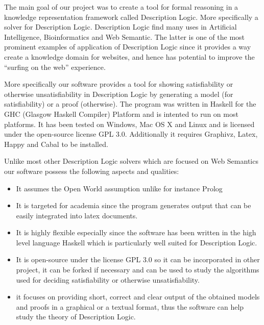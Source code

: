 
The main goal of our project was to create a tool for formal reasoning
in a knowledge representation framework called Description Logic. More
specifically a solver for Description Logic. Description Logic find
many uses in Artificial Intelligence, Bioinformatics and Web
Semantic. The latter is one of the most prominent examples of
application of Description Logic since it provides a way create a
knowledge domain for websites, and hence has potential to improve the
``surfing on the web'' experience.

More specifically our software provides a tool for showing
satisfiability or otherwise unsatisfiability in Description Logic by
generating a model (for satisfiability) or a proof (otherwise). The
program was written in Haskell for the GHC (Glasgow Haskell Compiler)
Platform and is intented to run on most platforms. It has been tested
on Windows, Mac OS X and Linux and is licensed under the open-source
license GPL 3.0. Additionally it requires Graphivz, Latex, Happy and
Cabal to be installed. 

Unlike most other Description Logic solvers which are focused on Web
Semantics our software possess the following aspects and qualities: 

\begin{itemize}
\item It assumes the Open World assumption unlike for instance Prolog
\item It is targeted for academia since the program generates output
  that can be easily integrated into latex documents.
\item It is highly flexible especially since the software has been
  written in the high level language Haskell which is particularly
  well suited for Description Logic.
\item It is open-source under the license GPL 3.0 so it can be
  incorporated in other project, it can be forked if necessary and can
  be used to study the algorithms used for deciding satisfiability or
  otherwise unsatisfiability.
\item it focuses on providing short, correct and clear output of the
  obtained models and proofs in a graphical or a textual format, thus
  the software can help study the theory of Description Logic.
\end{itemize}

